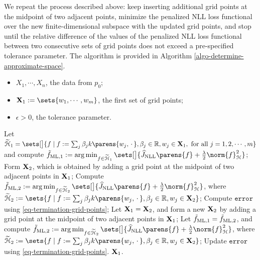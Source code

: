 We repeat the process described above: keep inserting additional grid points at the midpoint of two adjacent points, minimize the penalized NLL loss functional over the new finite-dimensional subspace with the updated grid points, and stop until the relative difference of the values of the penalized NLL loss functional between two consecutive sets of grid points does not exceed a pre-specified tolerance parameter. The algorithm is provided in Algorithm \ref{algo-determine-approximate-space}. 

\begin{algorithm}
\caption{Determining the finite-dimensional subspace of approximating the minimizer of $\widehat{J}_{\NLL} \parens{f} + \frac{\lambda}{2} \norm{f}_{\calH}^2$ over $f \in \calH$}\label{algo-determine-approximate-space}
\begin{algorithmic}[1]
\Statex \algorithmicrequire 
\begin{itemize}\setlength\itemsep{0em}
	\item $X_1, \cdots, X_n$, the data from $p_0$; 
	\item $\bX_1 := \sets{w_1, \cdots, w_m}$, the first set of grid points; 
	\item $\epsilon > 0$, the tolerance parameter. 
\end{itemize}

\vspace{5pt}

\State Let $\widetilde{\calH}_{1} = \sets[\big]{f \mid f := \sum_{j} \beta_j k \parens{w_j, \,\cdot\,}, \beta_j \in \Real, w_j \in \bX_1, \text{ for all } j = 1, 2, \cdots, m}$ and compute $\tilde{f}_{\ML, 1} := \argmin_{f \in \widetilde{\calH}_1} \sets[\big]{\widehat{J}_{\NLL} \parens{f} + \frac{\lambda}{2} \norm{f}_{\calH}^2}$; 
\State Form $\mathbf{X}_2$, which is obtained by adding a grid point at the midpoint of two adjacent points in $\mathbf{X}_1$; 
\State Compute $\tilde{f}_{\ML, 2} := \argmin_{f \in \widetilde{\calH}_2} \sets[\big]{\widehat{J}_{\NLL} \parens{f} + \frac{\lambda}{2} \norm{f}_{\calH}^2}$, where $\widetilde{\calH}_2 := \sets{f \mid f := \sum_{j} \beta_j k \parens{w_j, \,\cdot\,}, \beta_j \in \Real, w_j \in \bX_2}$; 
\State Compute $\mathtt{error}$ using \eqref{eq-termination-grid-points}; 
\State Let $\mathbf{X}_1 = \mathbf{X}_2$, and form a new $\mathbf{X}_2$ by adding a grid point at the midpoint of two adjacent points in $\mathbf{X}_1$; 
\State Let $\tilde{f}_{\mathrm{ML}, 1} = \tilde{f}_{\mathrm{ML}, 2}$, and compute $\tilde{f}_{\ML, 2} := \argmin_{f \in \widetilde{\calH}_2} \sets[\big]{\widehat{J}_{\NLL} \parens{f} + \frac{\lambda}{2} \norm{f}_{\calH}^2}$, where $\widetilde{\calH}_2 := \sets{f \mid f := \sum_{j} \beta_j k \parens{w_j, \,\cdot\,}, \beta_j \in \Real, w_j \in \bX_2}$; 
\State Update $\mathtt{error}$ using \eqref{eq-termination-grid-points}. 
\EndWhile
\State \Return $\mathbf{X}_{1}$. 
\end{algorithmic}
\end{algorithm}


